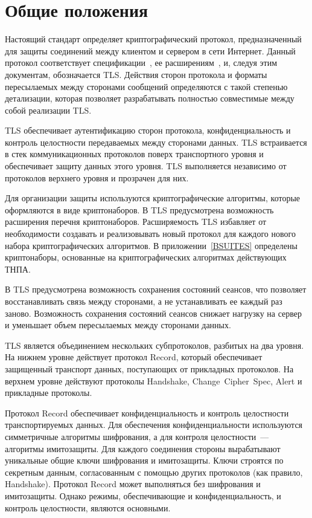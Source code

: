 \chapter{Общие положения}\label{COMMON}

Настоящий стандарт определяет криптографический протокол, предназначенный 
для защиты соединений между клиентом и сервером в сети Интернет. 
Данный протокол соответствует спецификации~\cite{RFC5246}, 
ее расширениям~\cite{RFC4279}, \cite{RFC5746}  и, следуя этим документам, 
обозначается TLS. Действия сторон протокола и форматы пересылаемых между 
сторонами сообщений определяются с такой степенью детализации, которая 
позволяет разрабатывать полностью совместимые между собой реализации TLS. 

TLS обеспечивает аутентификацию сторон протокола, конфиденциальность и 
контроль целостности передаваемых между сторонами данных. TLS 
встраивается в стек коммуникационных протоколов поверх транспортного 
уровня и обеспечивает защиту данных этого уровня. TLS выполняется 
независимо от протоколов верхнего уровня и прозрачен для них. 

Для организации защиты используются криптографические алгоритмы, которые 
оформляются в виде криптонаборов. В TLS предусмотрена возможность 
расширения перечня криптонаборов. Расширяемость TLS избавляет от 
необходимости создавать и реализовывать новый протокол для каждого нового 
набора криптографических алгоритмов. В приложении~\ref{BSUITES} определены 
криптонаборы, основанные на криптографических алгоритмах действующих ТНПА. 
  
В TLS предусмотрена возможность сохранения состояний сеансов, что 
позволяет восстанавливать связь между сторонами, а не устанавливать ее 
каждый раз заново. Возможность сохранения состояний сеансов снижает 
нагрузку на сервер и уменьшает объем пересылаемых между сторонами данных. 

TLS является объединением нескольких субпротоколов, разбитых на два 
уровня. На нижнем уровне действует протокол Record, который обеспечивает 
защищенный транспорт данных, поступающих от прикладных протоколов. На 
верхнем уровне действуют протоколы Handshake, Change~Cipher~Spec, Alert и 
прикладные протоколы. 

Протокол Record обеспечивает конфиденциальность и контроль целостности 
транспортируемых данных. Для обеспечения конфиденциальности используются 
симметричные алгоритмы шифрования, а для контроля целостности~--- алгоритмы 
имитозащиты. Для каждого соединения стороны вырабатывают уникальные общие 
ключи шифрования и имитозащиты. Ключи строятся по секретным данным, 
согласованным с помощью других протоколов (как правило, Handshake). 
Протокол Record может выполняться без шифрования и имитозащиты. Однако 
режимы, обеспечивающие и конфиденциальность, и контроль целостности, 
являются основными. 

